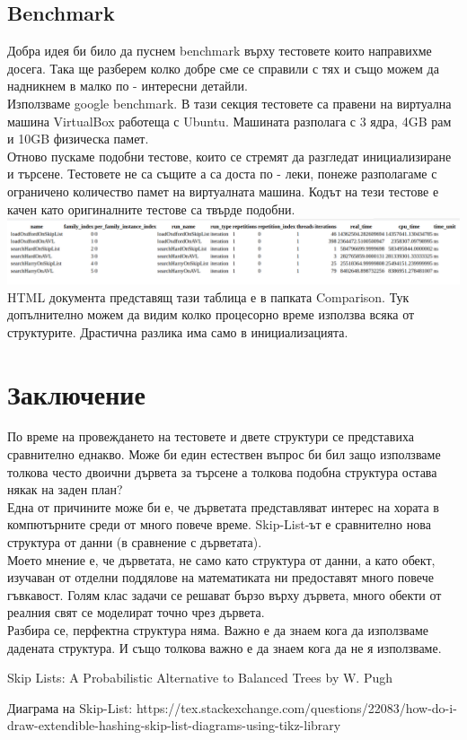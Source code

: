 \documentclass[a4paper,12pt,fleqn]{article}
\begin{document}
\subsection{Benchmark}
Добра идея би било да пуснем benchmark върху тестовете които направихме досега. Така ще разберем колко добре сме се справили с тях и също можем да надникнем в малко по - интересни детайли.\\
Използваме google benchmark. В тази секция тестовете са правени на виртуална машина VirtualBox работеща с Ubuntu. Машината разполага с 3 ядра, 4GB рам и 10GB физическа памет.\\
Отново пускаме подобни тестове, които се стремят да разгледат инициализиране и търсене. Тестовете не са същите а са доста по - леки, понеже разполагаме с ограничено количество памет на виртуалната машина. Кодът на тези тестове е качен като оригиналните тестове са твърде подобни.\\
\includegraphics[scale=0.25]{html-final.png}\\
HTML документа представящ тази таблица е в папката Comparison. Тук допълнително можем да видим колко процесорно време използва всяка от структурите. Драстична разлика има само в инициализацията.

\section{Заключение}
По време на провеждането на тестовете и двете структури се представиха сравнително еднакво. Може би един естествен въпрос би бил защо използваме толкова често двоични дървета за търсене а толкова подобна структура остава някак на заден план?\\
Една от причините може би е, че дърветата представляват интерес на хората в компютърните среди от много повече време. Skip-List-ът е сравнително нова структура от данни (в сравнение с дърветата).\\
Моето мнение е, че дърветата, не само като структура от данни, а като обект, изучаван от отделни поддялове на математиката ни предоставят много повече гъвкавост. Голям клас задачи се решават бързо върху дървета, много обекти от реалния свят се моделират точно чрез дървета.\\
Разбира се, перфектна структура няма. Важно е да знаем кога да използваме дадената структура. И също толкова важно е да знаем кога да не я използваме.

\begin{thebibliography}{9}
 Skip Lists: A Probabilistic Alternative to Balanced Trees by W. Pugh

 Диаграма на Skip-List: https://tex.stackexchange.com/questions/22083/how-do-i-draw-extendible-hashing-skip-list-diagrams-using-tikz-library
\end{thebibliography}
\end{document}
